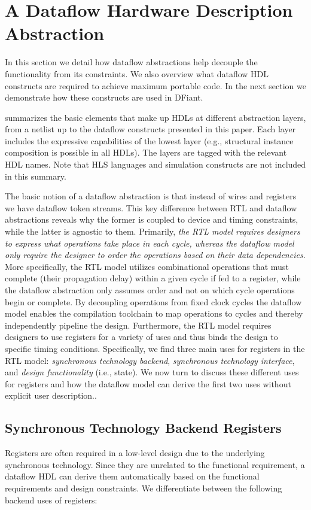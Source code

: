 \section{A Dataflow Hardware Description Abstraction}
\label{sec:motivation}
In this section we detail how dataflow abstractions help decouple the functionality from its constraints. We also overview what dataflow HDL constructs are required to achieve maximum portable code. In the next section we demonstrate how these constructs are used in DFiant.

 summarizes the basic elements that make up HDLs at different abstraction layers, from a netlist up to the dataflow constructs presented in this paper. Each layer includes the expressive capabilities of the lowest layer (e.g., structural instance composition is possible in all HDLs). The layers are tagged with the relevant HDL names. Note that HLS languages and simulation constructs are not included in this summary. 

The basic notion of a dataflow abstraction is that instead of wires and registers we have dataflow token streams. This key difference between RTL and dataflow abstractions reveals why the former is coupled to device and timing constraints, while the latter is agnostic to them. Primarily, \emph{the RTL model requires designers to express what operations take place in each cycle, whereas the dataflow model only require the designer to order the operations based on their data dependencies}. More specifically, the RTL model utilizes combinational operations that must complete (their propagation delay) within a given cycle if fed to a register, while the dataflow abstraction only assumes order and not on which cycle operations begin or complete. By decoupling operations from fixed clock cycles the dataflow model enables the compilation toolchain to map operations to cycles and thereby independently pipeline the design. Furthermore, the RTL model requires designers to use registers for a variety of uses and thus binds the design to specific timing conditions. Specifically, we find three main uses for registers in the RTL model: \emph{synchronous technology backend}, \emph{synchronous technology interface}, and \emph{design functionality} (i.e., state). We now turn to discuss these different uses for registers and how the dataflow model can derive the first two uses without explicit user description..

\subsection{Synchronous Technology Backend Registers}
Registers are often required in a low-level design due to the underlying synchronous technology. Since they are unrelated to the functional requirement, a dataflow HDL can derive them automatically based on the functional requirements and design constraints. 
We differentiate between the following backend uses of registers:
